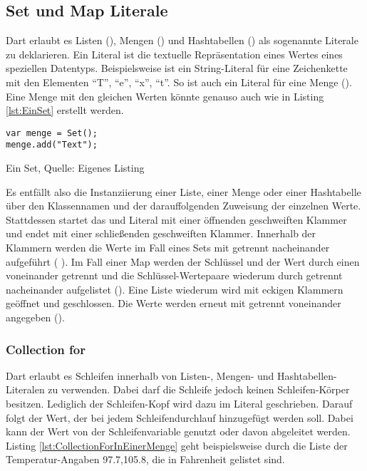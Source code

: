 \subsection{Set und Map Literale}

Dart erlaubt es Listen (), Mengen () und Hashtabellen () als sogenannte Literale zu deklarieren.
Ein Literal ist die textuelle Repräsentation eines Wertes eines speziellen Datentyps.
Beispielsweise ist   ein String-Literal für eine Zeichenkette mit den Elementen \enquote{T}, \enquote{e}, \enquote{x}, \enquote{t}.
So ist auch   ein Literal für eine Menge ().
Eine Menge mit den gleichen Werten könnte genauso auch wie in Listing \ref{lst:EinSet} erstellt werden.

\ifIncludeFigures
  \begin{listing}[ht]
    \begin{verbatim}
var menge = Set();
menge.add("Text");
\end{verbatim}
    \caption[Ein Set]{Ein Set, Quelle: Eigenes Listing}
    \label{lst:EinSet}
  \end{listing}
\fi

Es entfällt also die Instanziierung einer Liste, einer Menge oder einer Hashtabelle über den Klassennamen und der darauffolgenden Zuweisung der einzelnen Werte.
Stattdessen startet das  und  Literal mit einer öffnenden geschweiften Klammer und endet mit einer schließenden geschweiften Klammer.
Innerhalb der Klammern werden die Werte im Fall eines Sets mit \IC{,} getrennt nacheinander aufgeführt (  ).
Im Fall einer Map werden der Schlüssel und der Wert durch einen \IC{:} voneinander getrennt und die Schlüssel-Wertepaare wiederum durch \IC{,} getrennt nacheinander aufgelistet ().
Eine Liste wiederum wird mit eckigen Klammern geöffnet und geschlossen.
Die Werte werden erneut mit \IC{,} getrennt voneinander angegeben (\IC{[1,2]}).

\subsubsection{Collection for} Dart erlaubt es Schleifen innerhalb von Listen-, Mengen- und Hashtabellen-Literalen zu verwenden.
Dabei darf die Schleife jedoch keinen Schleifen-Körper besitzen.
Lediglich der Schleifen-Kopf wird dazu im Literal geschrieben.
Darauf folgt der Wert, der bei jedem Schleifendurchlauf hinzugefügt werden soll.
Dabei kann der Wert von der Schleifenvariable genutzt oder davon abgeleitet werden.
Listing \ref{lst:CollectionForInEinerMenge} geht beispielsweise durch die Liste der Temperatur-Angaben 97.7,105.8, die in Fahrenheit gelistet sind.

